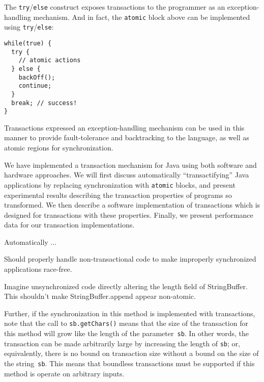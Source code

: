 \documentclass[preprint]{rdbacmconf}
\begin{document}
The {\tt try}/{\tt else} construct exposes transactions to the
programmer as an exception-handling mechanism.  And in fact,
the {\tt atomic} block above can be implemented using
{\tt try}/{\tt else}:
 \par {\footnotesize\samepage
\begin{verbatim}
while(true) {
  try {
    // atomic actions
  } else {
    backOff();
    continue;
  }
  break; // success!
}
\end{verbatim}
}
Transactions expressed an exception-handling mechanism can be used in this
manner to provide fault-tolerance and backtracking to the language, as
well as atomic regions for synchronization.

\vspace*{5mm}
We have implemented a transaction mechanism for Java using both
software and hardware approaches.  We will first discuss automatically
``transactifying'' Java applications by replacing synchronization with
{\tt atomic} blocks, and present experimental results describing the
transaction properties of programs so transformed.
We then describe a software implementation of transactions which is
designed for transactions with these properties.  Finally, we present
performance data for our transaction implementations.

Automatically ...

Should properly handle non-transactional code to make improperly
synchronized applications race-free.

Imagine unsynchronized code directly altering the length field of
StringBuffer.  This shouldn't make StringBuffer.append appear non-atomic.


Further, if the synchronization in this method is implemented with
transactions, note that the call to \texttt{sb.getChars()} means that
the size of the transaction for this method will grow like the length
of the parameter~\texttt{sb}.  In other words, the transaction can be
made arbitrarily large by increasing the length of \texttt{sb}; or,
equivalently, there is no bound on transaction size without a bound on
the size of the string~\texttt{sb}.  This means that boundless
transactions must be supported if this method is operate on arbitrary
inputs.

\end{document}
